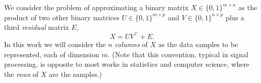 \documentclass[twocolumn]{IEEEtran}
\theoremstyle{definition}
\def\transp{^\intercal}
\newcommand{\refeq}[1]{(\ref{#1})}
\begin{document}
We consider the problem of approximating a binary matrix $X \in \{0,1\}^{m{\times}n}$ as the product of two other binary matrices $U \in \{0,1\}^{m{\times}p}$ and $V \in \{0,1\}^{n{\times}p}$ plus a third \emph{residual} matrix $E$,
\begin{equation}
X = UV\transp + E.
\label{eq:mf}
\end{equation}
In this work we will consider the $n$ \emph{columns} of $X$ as the data samples to be represented, each of dimension $m$. (Note that this convention, typical in signal processing, is opposite to most works in statistics and computer science, where the \emph{rows} of $X$ are the samples.)
%
\end{document}
